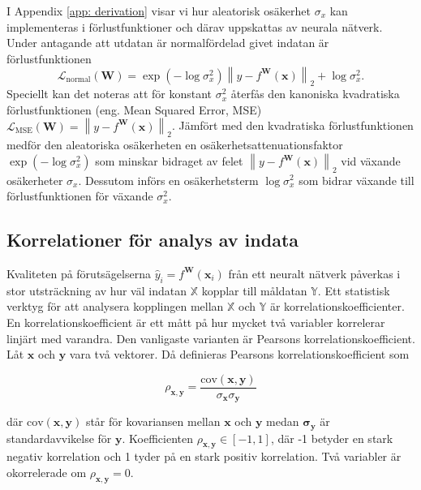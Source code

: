 I Appendix \ref{app: derivation} visar vi hur aleatorisk osäkerhet $\sigma_x$ kan implementeras i förlustfunktioner och därav uppskattas av neurala nätverk. Under antagande att utdatan är normalfördelad givet indatan är förlustfunktionen
\begin{equation}
    \mathcal{L}_{\mathrm{normal}}(\mathbf{W}) = \exp{\left(-\log \sigma_x^2 \right)} \left\|y - f^\mathbf{W}(\mathbf{x})\right\|_2 + \log \sigma_x^2.
    \label{eq:loss_fcn}
\end{equation}
Speciellt kan det noteras att för konstant $\sigma_x^2$ återfås den kanoniska kvadratiska förlustfunktionen (eng. Mean Squared Error, MSE) $\mathcal{L}_\mathrm{MSE}(\mathbf{W}) = \left\|y - f^\mathbf{W}(\mathbf{x})\right\|_2$. Jämfört med den kvadratiska förlustfunktionen medför den aleatoriska osäkerheten en osäkerhetsattenuationsfaktor $\exp{\left(-\log \sigma_x^2 \right)}$ som minskar bidraget av felet $\left\|y - f^\mathbf{W}(\mathbf{x})\right\|_2$ vid växande osäkerheter $\sigma_x$. Dessutom införs en osäkerhetsterm $\log \sigma_x^2$ som bidrar växande till förlustfunktionen för växande $\sigma_x^2$.

\subsection{Korrelationer för analys av indata}
\label{sec:korre}
Kvaliteten på förutsägelserna $\hat{y}_i = f^\mathbf{W}(\mathbf{x}_i)$ från ett neuralt nätverk påverkas i stor utsträckning av hur väl indatan $\mathbb{X}$ kopplar till måldatan $\mathbb{Y}$. Ett statistisk verktyg för att analysera kopplingen mellan $\mathbb{X}$ och $\mathbb{Y}$ är korrelationskoefficienter. En korrelationskoefficient är ett mått på hur mycket två variabler korrelerar linjärt med varandra. Den vanligaste varianten är Pearsons korrelationskoefficient. Låt $\mathbf{x}$ och $\mathbf{y}$ vara två vektorer. Då definieras Pearsons korrelationskoefficient som \cite{ProbStat}

\begin{equation}
    \rho_{\mathbf{x},\mathbf{y}} = \frac{\text{cov}(\mathbf{x,y})}{\sigma_\mathbf{x}\sigma_\mathbf{y}}
\end{equation}

\noindent
där $\text{cov}(\mathbf{x,y})$ står för kovariansen mellan $\mathbf{x}$ och $\mathbf{y}$ medan $\mathbf{\sigma}_\mathbf{y}$ är standardavvikelse för $\mathbf{y}$. Koefficienten $\rho_{\mathbf{x},\mathbf{y}} \in [-1,1]$, där -1 betyder en stark negativ korrelation och 1 tyder på en stark positiv korrelation. Två variabler är okorrelerade om $\rho_{\mathbf{x},\mathbf{y}} = 0$. 


